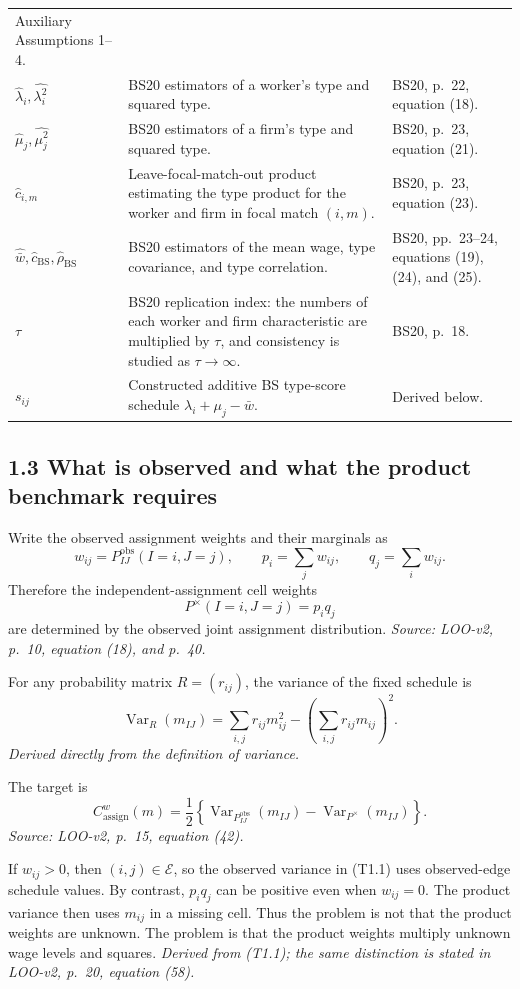 \documentclass[11pt]{article}
\begin{document}
\begin{longtable}{p{}p{}p{}}
Auxiliary Assumptions 1--4. \\
\(\widehat\lambda_i,\widehat{\lambda_i^2}\) & BS20 estimators of a worker's
type and squared type. & BS20, p.\ 22, equation (18). \\
\(\widehat\mu_j,\widehat{\mu_j^2}\) & BS20 estimators of a firm's type and
squared type. & BS20, p.\ 23, equation (21). \\
\(\widehat c_{i,m}\) & Leave-focal-match-out product estimating the type
product for the worker and firm in focal match \((i,m)\). & BS20, p.\ 23,
equation (23). \\
\(\widehat{\bar w},\widehat c_{\mathrm{BS}},\widehat\rho_{\mathrm{BS}}\) &
BS20 estimators of the mean wage, type covariance, and type correlation. &
BS20, pp.\ 23--24, equations (19), (24), and (25). \\
\(\tau\) & BS20 replication index: the numbers of each worker and firm
characteristic are multiplied by \(\tau\), and consistency is studied as
\(\tau\to\infty\). & BS20, p.\ 18. \\
\(s_{ij}\) & Constructed additive BS type-score schedule
\(\lambda_i+\mu_j-\bar w\). & Derived below. \\
\end{longtable}

\subsection{1.3 What is observed and what the product benchmark requires}

Write the observed assignment weights and their marginals as
\[
w_{ij}=P^{\mathrm{obs}}_{IJ}(I=i,J=j),\qquad
p_i=\sum_jw_{ij},\qquad q_j=\sum_iw_{ij}.
\]
Therefore the independent-assignment cell weights
\[
P^\times(I=i,J=j)=p_iq_j
\]
are determined by the observed joint assignment distribution.
\textit{Source: LOO-v2, p.\ 10, equation (18), and p.\ 40.}

For any probability matrix \(R=(r_{ij})\), the variance of the fixed schedule is
\[
\operatorname{Var}_{R}(m_{IJ})
=\sum_{i,j}r_{ij}m_{ij}^{2}
-\left(\sum_{i,j}r_{ij}m_{ij}\right)^2.
\]
\textit{Derived directly from the definition of variance.}

The target is
\[
C^w_{\mathrm{assign}}(m)
=\frac12\left\{
\operatorname{Var}_{P^{\mathrm{obs}}_{IJ}}(m_{IJ})
-\operatorname{Var}_{P^\times}(m_{IJ})
\right\}.
\tag{T1.1}
\]
\textit{Source: LOO-v2, p.\ 15, equation (42).}

If \(w_{ij}>0\), then \((i,j)\in\mathcal E\), so the observed variance in
(T1.1) uses observed-edge schedule values.  By contrast, \(p_iq_j\) can be
positive even when \(w_{ij}=0\).  The product variance then uses \(m_{ij}\) in
a missing cell.  Thus the problem is not that the product weights are unknown.
The problem is that the product weights multiply unknown wage levels and
squares.  \textit{Derived from (T1.1); the same distinction is stated in
LOO-v2, p.\ 20, equation (58).}
\end{document}
